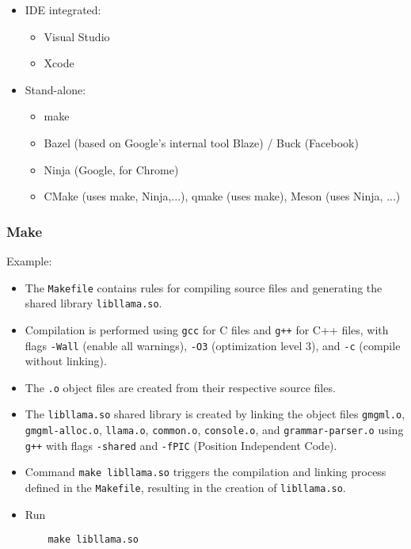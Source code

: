 \documentclass[12pt]{article}
\begin{document}
\begin{itemize}
    \item IDE integrated:
    \begin{itemize}
        \item Visual Studio
        \item Xcode
    \end{itemize}
    
    \item Stand-alone:
    \begin{itemize}
        \item make
        \item Bazel (based on Google's internal tool Blaze) / Buck (Facebook)
        \item Ninja (Google, for Chrome)
        \item CMake (uses make, Ninja,...), qmake (uses make), Meson (uses Ninja, ...)
    \end{itemize}
\end{itemize}

\subsubsection{Make}
Example:
\begin{itemize}
    \item The \texttt{Makefile} contains rules for compiling source files and generating the shared library \texttt{libllama.so}.
    \item Compilation is performed using \texttt{gcc} for C files and \texttt{g++} for C++ files, with flags \texttt{-Wall} (enable all warnings), \texttt{-O3} (optimization level 3), and \texttt{-c} (compile without linking).
    \item The \texttt{.o} object files are created from their respective source files.
    \item The \texttt{libllama.so} shared library is created by linking the object files \texttt{gmgml.o}, \texttt{gmgml-alloc.o}, \texttt{llama.o}, \texttt{common.o}, \texttt{console.o}, and \texttt{grammar-parser.o} using \texttt{g++} with flags \texttt{-shared} and \texttt{-fPIC} (Position Independent Code).
    \item Command \texttt{make libllama.so} triggers the compilation and linking process defined in the \texttt{Makefile}, resulting in the creation of \texttt{libllama.so}.
    \item Run
    \begin{lstlisting}
    make libllama.so
    \end{lstlisting}
\end{itemize}
\end{document}
